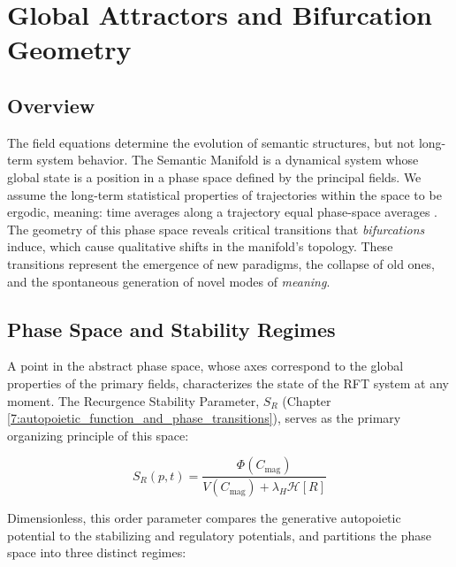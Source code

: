 \chapter{Global Attractors and Bifurcation Geometry}
\label{11:global_attractors_and_bifurcation_geometry}


\section{Overview}
\label{11.1:overview}

The field equations determine the evolution of semantic structures, but not long-term system behavior. The Semantic Manifold is a dynamical system whose global state is a position in a phase space defined by the principal fields. We assume the long-term statistical properties of trajectories within the space to be ergodic, meaning: time averages along a trajectory equal phase-space averages \autocite{Birkhoff1931}. The geometry of this phase space reveals critical transitions that \textit{bifurcations} induce, which cause qualitative shifts in the manifold's topology. These transitions represent the emergence of new paradigms, the collapse of old ones, and the spontaneous generation of novel modes of \textit{meaning}.


\section{Phase Space and Stability Regimes}
\label{11.2:phase_space_and_stability_regimes}

A point in the abstract phase space, whose axes correspond to the global properties of the primary fields, characterizes the state of the RFT system at any moment. The Recurgence Stability Parameter, \(S_R\) (Chapter \ref{7:autopoietic_function_and_phase_transitions}), serves as the primary organizing principle of this space:

\begin{equation}
S_R(p,t) = \frac{\Phi(C_{\mathrm{mag}})}{V(C_{\mathrm{mag}}) + \lambda_H \mathcal{H}[R]}
\end{equation}

Dimensionless, this order parameter compares the generative autopoietic potential to the stabilizing and regulatory potentials, and partitions the phase space into three distinct regimes:

